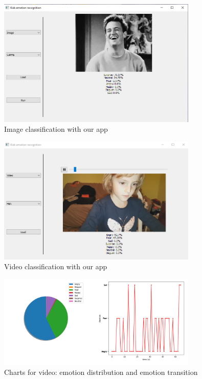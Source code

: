 \documentclass[runningheads,a4paper,11pt]{report}
\begin{document}
\begin{figure}[!ht]
  \label{fig::app1}
  \centering
  \includegraphics[width=0.85\textwidth]{Images/app_1.png}
  \caption{Image classification with our app}
\end{figure}


\begin{figure}[!ht]
  \label{fig::app2}
  \centering
  \includegraphics[width=0.85\textwidth]{Images/app_2.png}
  \caption{Video classification with our app}
\end{figure}


\begin{figure}[!ht]
  \label{fig::app3}
  \centering
  \includegraphics[width=0.85\textwidth]{Images/app_3.png}
  \caption{Charts for video: emotion distribution and emotion transition}
\end{figure}
\end{document}
